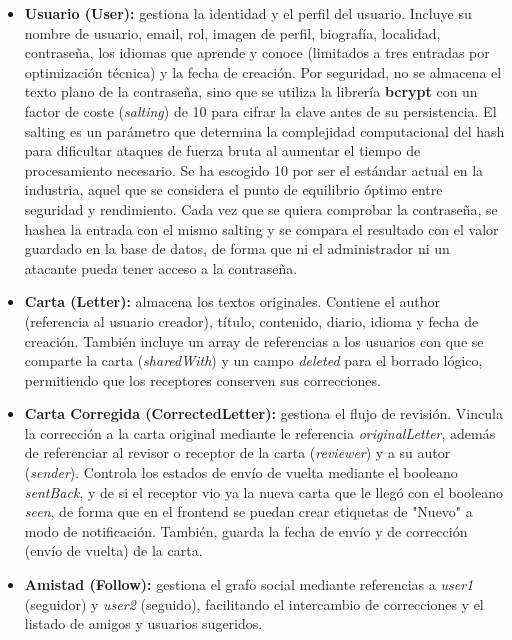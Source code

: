 \begin{itemize}
\item \textbf{Usuario (User):} gestiona la identidad y el perfil del usuario. Incluye su nombre de usuario, email, rol, imagen de perfil, biografía, localidad, contraseña, los idiomas que aprende y conoce (limitados a tres entradas por optimización técnica) y la fecha de creación.
Por seguridad, no se almacena el texto plano de la contraseña, sino que se utiliza la librería \textbf{bcrypt} con un factor de coste (\textit{salting}) de 10 para cifrar la clave antes de su persistencia. El salting es un parámetro que determina la complejidad computacional del hash para dificultar ataques de fuerza bruta al aumentar el tiempo de procesamiento necesario. Se ha escogido 10 por ser el estándar actual en la industria, aquel que se considera el punto de equilibrio óptimo entre seguridad y rendimiento. Cada vez que se quiera comprobar la contraseña, se hashea la entrada con el mismo salting y se compara el resultado con el valor guardado en la base de datos, de forma que ni el administrador ni un atacante pueda tener acceso a la contraseña.

\item \textbf{Carta (Letter):} almacena los textos originales. Contiene el author (referencia al usuario creador), título, contenido, diario, idioma y fecha de creación. También incluye un array de referencias a los usuarios con que se comparte la carta (\textit{sharedWith}) y un campo \textit{deleted} para el borrado lógico, permitiendo que los receptores conserven sus correcciones.

\item \textbf{Carta Corregida (CorrectedLetter):} gestiona el flujo de revisión. Vincula la corrección a la carta original mediante le referencia \textit{originalLetter}, además de referenciar al revisor o receptor de la carta (\textit{reviewer}) y a su autor (\textit{sender}). Controla los estados de envío de vuelta mediante el booleano \textit{sentBack}, y de si el receptor vio ya la nueva carta que le llegó con el booleano \textit{seen}, de forma que en el frontend se puedan crear etiquetas de "Nuevo" a modo de notificación. También, guarda la fecha de envío y de corrección (envío de vuelta) de la carta.

\item \textbf{Amistad (Follow):} gestiona el grafo social mediante referencias a \textit{user1} (seguidor) y \textit{user2} (seguido), facilitando el intercambio de correcciones y el listado de amigos y usuarios sugeridos.


\end{itemize}
